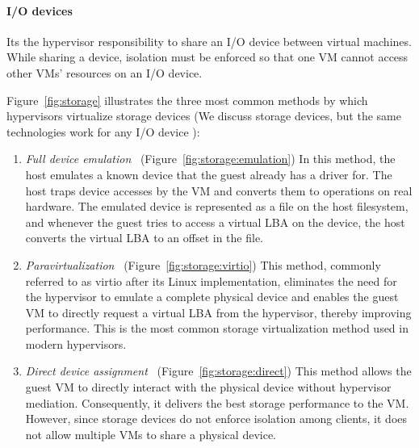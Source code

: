\paragraph {I/O devices}
Its the hypervisor responsibility to share an I/O device between virtual machines. While sharing a device, isolation must be enforced so that one VM cannot access other VMs' resources on an I/O device.  

Figure~\ref{fig:storage} illustrates the three most common methods by which hypervisors virtualize storage devices (We discuss storage devices, but the same technologies work for any I/O device ):

\begin{enumerate}
\item
  \emph{Full device emulation}~\cite{sugerman2001virtualizing} (Figure~\ref{fig:storage:emulation})\quad 
  In this method, the host emulates a known device that the guest already has a driver for. The host traps device accesses by the VM and converts them to operations on real hardware. The emulated device is represented as a file on the host filesystem, and whenever the guest tries to access a virtual LBA on the device, the host converts the virtual LBA to an offset in the file.

\item
  \emph{Paravirtualization}~\cite{barham2003xen,russell2008virtio} (Figure~\ref{fig:storage:virtio})\quad
  This method, commonly referred to as virtio after its Linux implementation, eliminates the need for the hypervisor to emulate a complete physical device and enables the guest VM to directly request a virtual LBA from the hypervisor, thereby improving performance. This is the most common storage virtualization method used in modern hypervisors.

\item
  \emph{Direct device assignment}~\cite{raj2007high} (Figure~\ref{fig:storage:direct})\quad
  This method allows the guest VM to directly interact with the physical device without hypervisor mediation. Consequently, it delivers the best storage performance to the VM. However, since storage devices do not enforce isolation among clients, it does not allow multiple VMs to share a physical device.
\end{enumerate}



